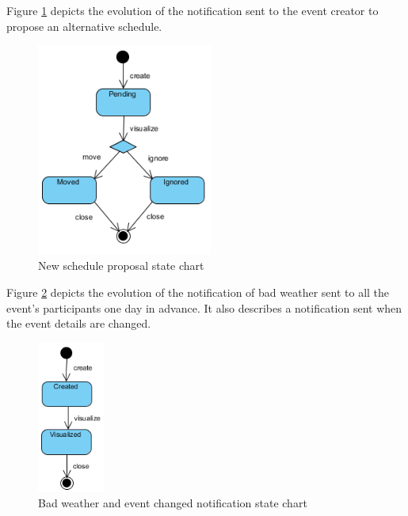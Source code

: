 \documentclass[10pt,a4paper,titlepage]{article}
\begin{document}
Figure \ref{fig:3DayStateChart} depicts the evolution of the notification sent to the event creator to propose an alternative schedule.
\begin{figure}[h!]
\centering
\includegraphics[height=7cm]{./Uml/StateDiagram_3day.png}
\caption[3DayStateChart]{New schedule proposal state chart}
\label{fig:3DayStateChart}
\end{figure}

Figure \ref{fig:badWeatherStateChart} depicts the evolution of the notification of bad weather sent to all the event's participants one day in advance. It also describes a notification sent when the event details are changed.
\begin{figure}[h!]
\centering
\includegraphics[height=5cm]{./Uml/StateDiagram_badWeather_eventChanged.png}
\caption[BadWeatherStateChart]{Bad weather and event changed notification state chart}
\label{fig:badWeatherStateChart}
\end{figure}
\end{document}
